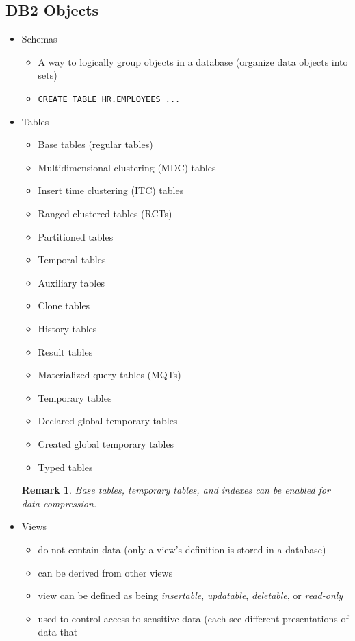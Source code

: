 \documentclass{article}
\newtheorem*{remark}{Remark}
\begin{document}
\subsection{DB2 Objects}
\begin{itemize}
\item Schemas
	\begin{itemize}
	\item A way to logically group objects in a database (organize data objects into sets)
	\item \texttt{CREATE TABLE HR.EMPLOYEES ...}
	\end{itemize}
\item Tables
	\begin{itemize}
	\item Base tables (regular tables)
	\item {\color{green} Multidimensional clustering (MDC) tables}
	\item {\color{green} Insert time clustering (ITC) tables}
	\item {\color{green} Ranged-clustered tables (RCTs)}
	\item Partitioned tables
	\item Temporal tables
	\item {\color{red} Auxiliary tables}
	\item {\color{red} Clone tables}
	\item History tables
	\item Result tables
	\item Materialized query tables (MQTs)
	\item Temporary tables
	\item Declared global temporary tables
	\item Created global temporary tables
	\item {\color{green} Typed tables}
	\end{itemize}
	\begin{remark}
	Base tables, temporary tables, and indexes can be enabled for data compression.
	\end{remark}
\item Views
	\begin{itemize}
	\item do not contain data (only a view's definition is stored in a database)
	\item can be derived from other views
	\item view can be defined as being \textit{insertable}, \textit{updatable}, \textit{deletable},
	or \textit{read-only}
	\item used to control access to sensitive data (each see different presentations of data that 

\end{itemize}
\end{itemize}
\end{document}
